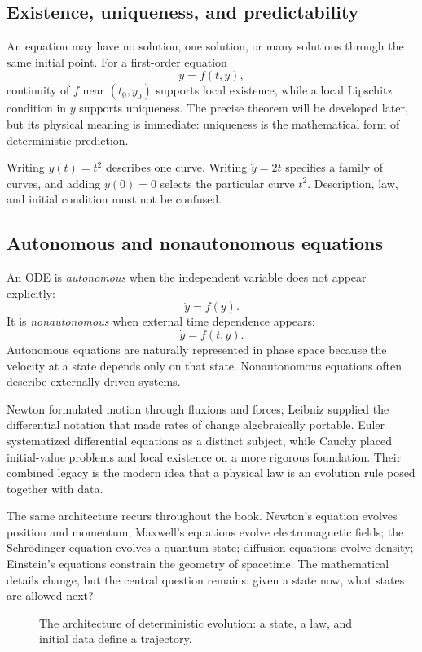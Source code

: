 \subsection{Existence, uniqueness, and predictability}
An equation may have no solution, one solution, or many solutions through the same initial point. For a first-order equation
\[
\dot y=f(t,y),
\]
continuity of $f$ near $(t_0,y_0)$ supports local existence, while a local Lipschitz condition in $y$ supports uniqueness. The precise theorem will be developed later, but its physical meaning is immediate: uniqueness is the mathematical form of deterministic prediction.

\begin{mistakebox}
Writing $y(t)=t^2$ describes one curve. Writing $\dot y=2t$ specifies a family of curves, and adding $y(0)=0$ selects the particular curve $t^2$. Description, law, and initial condition must not be confused.
\end{mistakebox}

\subsection{Autonomous and nonautonomous equations}
An ODE is \emph{autonomous} when the independent variable does not appear explicitly:
\[
\dot y=f(y).
\]
It is \emph{nonautonomous} when external time dependence appears:
\[
\dot y=f(t,y).
\]
Autonomous equations are naturally represented in phase space because the velocity at a state depends only on that state. Nonautonomous equations often describe externally driven systems.

\begin{historybox}
Newton formulated motion through fluxions and forces; Leibniz supplied the differential notation that made rates of change algebraically portable. Euler systematized differential equations as a distinct subject, while Cauchy placed initial-value problems and local existence on a more rigorous foundation. Their combined legacy is the modern idea that a physical law is an evolution rule posed together with data.
\end{historybox}

\begin{physicalbox}
The same architecture recurs throughout the book. Newton's equation evolves position and momentum; Maxwell's equations evolve electromagnetic fields; the Schrödinger equation evolves a quantum state; diffusion equations evolve density; Einstein's equations constrain the geometry of spacetime. The mathematical details change, but the central question remains: given a state now, what states are allowed next?
\end{physicalbox}

\begin{figure}[htbp]
\centering

\caption{The architecture of deterministic evolution: a state, a law, and initial data define a trajectory.}
\label{fig:ch4-evolution-architecture}
\end{figure}

